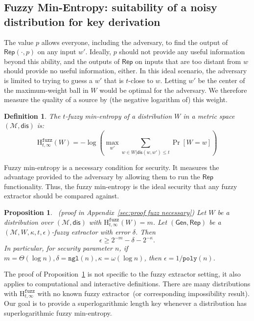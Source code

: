\documentclass[11pt]{article}
\newcommand{\apref}[1]{\mbox{Appendix~\ref{#1}}}
\newcommand{\lemref}[1]{\mbox{Lemma~\ref{#1}}}
\newcommand{\propref}[1]{\mbox{Proposition~\ref{#1}}}
\newcommand{\class}[1]{{\ensuremath{\mathsf{#1}}}}
\newcommand{\gen}{\ensuremath{\class{Gen}}\xspace}
\newcommand{\rep}{\ensuremath{\class{Rep}}\xspace}
\newcommand{\dis}{\ensuremath{\mathsf{dis}}}
\newcommand{\poly}{\ensuremath{\mathtt{poly}}\xspace}
\newcommand{\ngl}{\ensuremath{\mathtt{ngl}}\xspace}
\newcommand{\Hfuzz}{\mathrm{H}^{\mathtt{fuzz}}_{t,\infty}}
\newtheorem{proposition}[theorem]{Proposition}
\newtheorem{definition}[theorem]{Definition}
\begin{document}
\subsection{Fuzzy Min-Entropy: suitability of a noisy distribution for key derivation}
\label{sec:minimal conditions}
The value $p$ allows everyone, including the adversary, to find the output of $\rep(\cdot, p)$ on any input $w'$. Ideally,  $p$ should not provide any useful information beyond this ability, and the outputs of $\rep$ on inputs that are too distant from $w$ should provide no useful information, either.  In this ideal scenario, the adversary is limited to trying to guess a $w'$ that is $t$-close to $w$. 
Letting $w'$ be the center of the maximum-weight ball in $W$ would be optimal for the adversary.
We therefore measure the quality of a source by (the negative logarithm of) this weight.

\begin{definition}
\label{def:fuzzy min-ent}
The $t$-fuzzy min-entropy of a distribution $W$ in a metric space $(\mathcal{M}, \dis)$ is:
\[
\Hfuzz(W) = -\log \left(\max_{w'}  \sum_{w\in W | \dis(w, w')\le t} \Pr[W=w] \right)
\]
\end{definition}
\noindent
Fuzzy min-entropy is a necessary condition for security.  It measures the advantage provided to the adversary by allowing them to run the $\rep$ functionality.  Thus, the fuzzy min-entropy is the ideal security that any fuzzy extractor should be compared against.
\begin{proposition}~(proof in \apref{sec:proof fuzz necessary})
\label{prop:fuzz necessary}
Let $W$ be a distribution  over $(\mathcal{M}, \dis)$ with $\Hfuzz(W) =m$.  Let $(\gen, \rep)$ be a $(\mathcal{M}, W, \kappa, t, \epsilon)$-fuzzy extractor with error $\delta$.  Then 
\[
\epsilon\ge 2^{-m}-\delta -2^{-\kappa}.
\]
In particular, for security parameter $n$, if $m = \Theta(\log n), \delta = \ngl(n), \kappa = \omega(\log n)$, then $\epsilon  = 1/\poly(n)$.
\end{proposition}

The proof of \propref{prop:fuzz necessary} is not specific to the fuzzy extractor setting, it also applies to computational and interactive definitions.  There are many distributions with $\Hfuzz$ with no known fuzzy extractor~(or corresponding impossibility result).
Our goal is to provide a superlogarithmic length key whenever a distribution has superlogarithmic fuzzy min-entropy. 
\end{document}
